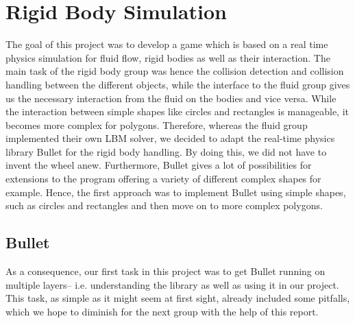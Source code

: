 \section{Rigid Body Simulation}

The goal of this project was to develop a game which is based on a real time physics simulation for fluid flow, rigid bodies as well as their interaction. The main task of the rigid body group was hence the collision detection and collision handling between the different objects, while the interface to the fluid group gives us the necessary interaction from the fluid on the bodies and vice versa. While the interaction between simple shapes like circles and rectangles is manageable, it becomes more complex for polygons. Therefore, whereas the fluid group implemented their own LBM solver, we decided to adapt the real-time physics library Bullet \cite{Bullet} for the rigid body handling. By doing this, we did not have to invent the wheel anew. Furthermore, Bullet gives a lot of possibilities for extensions to the program offering a variety of different complex shapes for example. Hence, the first approach was to implement Bullet using simple shapes, such as circles and rectangles and then move on to more complex polygons.

\subsection{Bullet}
As a consequence, our first task in this project was to get Bullet running on multiple layers-- i.e. understanding the library as well as using it in our project. This task, as simple as it might seem at first sight, already included some pitfalls, which we hope to diminish for the next group with the help of this report. 
